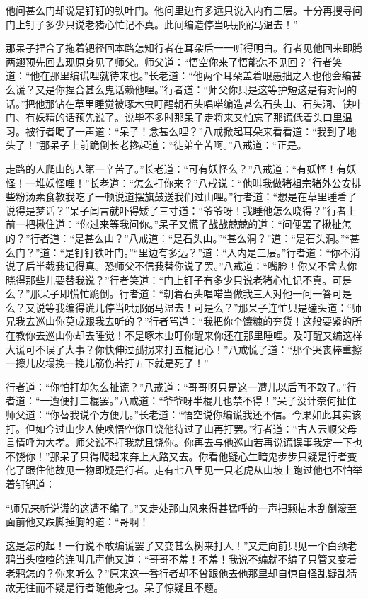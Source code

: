 \documentclass[12pt,UTF8]{ctexbook}
\begin{document}
他问甚么门却说是钉钉的铁叶门。他问里边有多远只说入内有三层。十分再搜寻问门上钉子多少只说老猪心忙记不真。此间编造停当哄那弼马温去！”

那呆子捏合了拖着钯径回本路怎知行者在耳朵后一一听得明白。行者见他回来即腾两翅预先回去现原身见了师父。师父道：“悟空你来了悟能怎不见回？”行者笑道：“他在那里编谎哩就待来也。”长老道：“他两个耳朵盖着眼愚拙之人也他会编甚么谎？又是你捏合甚么鬼话赖他哩。”行者道：“师父你只是这等护短这是有对问的话。”把他那钻在草里睡觉被啄木虫叮醒朝石头唱喏编造甚么石头山、石头洞、铁叶门、有妖精的话预先说了。说毕不多时那呆子走将来又怕忘了那谎低着头口里温习。被行者喝了一声道：“呆子！念甚么哩？”八戒掀起耳朵来看看道：“我到了地头了！”那呆子上前跪倒长老搀起道：“徒弟辛苦啊。”八戒道：“正是。

走路的人爬山的人第一辛苦了。”长老道：“可有妖怪么？”八戒道：“有妖怪！有妖怪！一堆妖怪哩！”长老道：“怎么打你来？”八戒说：“他叫我做猪祖宗猪外公安排些粉汤素食教我吃了一顿说道摆旗鼓送我们过山哩。”行者道：“想是在草里睡着了说得是梦话？”呆子闻言就吓得矮了三寸道：“爷爷呀！我睡他怎么晓得？”行者上前一把揪住道：“你过来等我问你。”呆子又慌了战战兢兢的道：“问便罢了揪扯怎的？”行者道：“是甚么山？”八戒道：“是石头山。”“甚么洞？”道：“是石头洞。”“甚么门？”道：“是钉钉铁叶门。”“里边有多远？”道：“入内是三层。”行者道：“你不消说了后半截我记得真。恐师父不信我替你说了罢。”八戒道：“嘴脸！你又不曾去你晓得那些儿要替我说？”行者笑道：“门上钉子有多少只说老猪心忙记不真。可是么？”那呆子即慌忙跪倒。行者道：“朝着石头唱喏当做我三人对他一问一答可是么？又说等我编得谎儿停当哄那弼马温去！可是么？”那呆子连忙只是磕头道：“师兄我去巡山你莫成跟我去听的？”行者骂道：“我把你个馕糠的夯货！这般要紧的所在教你去巡山你却去睡觉！不是啄木虫叮你醒来你还在那里睡哩。及叮醒又编这样大谎可不误了大事？你快伸过孤拐来打五棍记心！”八戒慌了道：“那个哭丧棒重擦一擦儿皮塌挽一挽儿筋伤若打五下就是死了！”

行者道：“你怕打却怎么扯谎？”八戒道：“哥哥呀只是这一遭儿以后再不敢了。”行者道：“一遭便打三棍罢。”八戒道：“爷爷呀半棍儿也禁不得！”呆子没计奈何扯住师父道：“你替我说个方便儿。”长老道：“悟空说你编谎我还不信。今果如此其实该打。但如今过山少人使唤悟空你且饶他待过了山再打罢。”行者道：“古人云顺父母言情呼为大孝。师父说不打我就且饶你。你再去与他巡山若再说谎误事我定一下也不饶你！”那呆子只得爬起来奔上大路又去。你看他疑心生暗鬼步步只疑是行者变化了跟住他故见一物即疑是行者。走有七八里见一只老虎从山坡上跑过他也不怕举着钉钯道：

“师兄来听说谎的这遭不编了。”又走处那山风来得甚猛呼的一声把颗枯木刮倒滚至面前他又跌脚捶胸的道：“哥啊！

这是怎的起！一行说不敢编谎罢了又变甚么树来打人！”又走向前只见一个白颈老鸦当头喳喳的连叫几声他又道：“哥哥不羞！不羞！我说不编就不编了只管又变着老鸦怎的？你来听么？”原来这一番行者却不曾跟他去他那里却自惊自怪乱疑乱猜故无往而不疑是行者随他身也。呆子惊疑且不题。
\end{document}
